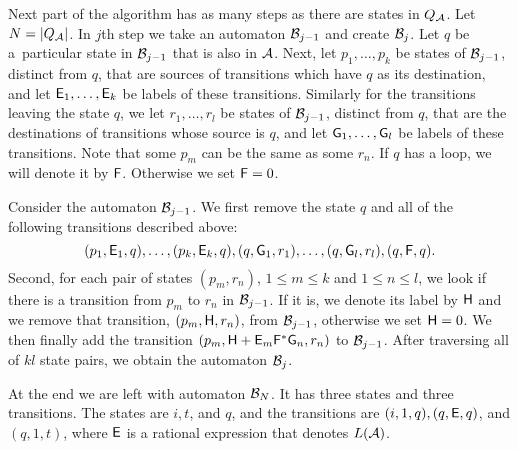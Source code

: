 Next part of the algorithm has as many steps as there are states in $Q_{{\mathcal{A}}}$. Let $N = |Q_{{\mathcal{A}}}|$. In $j$th step we take an automaton ${\mathcal{B}}_{j-1}$ and create ${\mathcal{B}}_j$. Let $q$ be a~particular state in ${\mathcal{B}}_{j-1}$ that is also in ${\mathcal{A}}$. Next, let $p_1, \dotsc , p_k$ be states of ${\mathcal{B}}_{j-1}$, distinct from $q$, that are sources of transitions which have $q$ as its destination, and let ${\mathsf{E}}_1, \dotsc , {\mathsf{E}}_k$ be labels of these transitions. Similarly for the transitions leaving the state $q$, we let $r_1, \dotsc , r_l$ be states of ${\mathcal{B}}_{j-1}$, distinct from $q$, that are the destinations of transitions whose source is $q$, and let ${\mathsf{G}}_1, \dotsc , {\mathsf{G}}_l$ be labels of these transitions. Note that some $p_m$ can be the same as some $r_n$. If $q$ has a loop, we will denote it by ${\mathsf{F}}$. Otherwise we set ${\mathsf{F}} = 0$.

Consider the automaton ${\mathcal{B}}_{j-1}$. We first remove the state $q$ and all of the following transitions described above:
\[
    (p_1, {\mathsf{E}}_1, q), \dotsc, (p_k, {\mathsf{E}}_k, q), (q, {\mathsf{G}}_1, r_1), \dotsc, (q, {\mathsf{G}}_l, r_l), (q, {\mathsf{F}}, q).
\]
Second, for each pair of states $(p_m, r_n)$, $1 \leq m \leq k$ and $1 \leq n \leq l$, we look if there is a transition from $p_m$ to $r_n$ in ${\mathcal{B}}_{j-1}$. If it is, we denote its label by ${\mathsf{H}}$ and we remove that transition, $(p_m, {\mathsf{H}}, r_n)$, from ${\mathcal{B}}_{j-1}$, otherwise we set ${\mathsf{H}} = 0$. We then finally add the transition $(p_m, {\mathsf{H}} + {\mathsf{E}}_m {\mathsf{F}}^* {\mathsf{G}}_n, r_n)$ to ${\mathcal{B}}_{j-1}$. After traversing all of $k l$ state pairs, we obtain the automaton ${\mathcal{B}}_j$.

At the end we are left with automaton ${\mathcal{B}}_N$. It has three states and three transitions. The states are $i, t$, and $q$, and the transitions are $(i, 1, q), (q, {\mathsf{E}}, q)$, and $(q, 1, t)$, where ${\mathsf{E}}$ is a rational expression that denotes $L({\mathcal{A}})$.